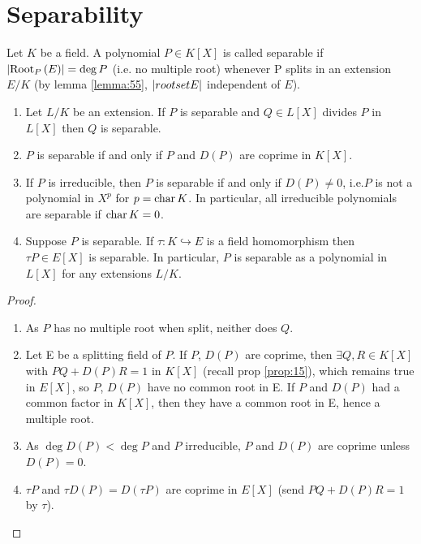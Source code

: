 \section{Separability}

\begin{definition}
\label{def:72}
  Let $K$ be a field. A polynomial $P \in K[X]$ is called separable if $\card{\rootset[P]{E}} = \deg P$ (i.e. no multiple root) whenever P splits in an extension $E/K$ (by lemma \ref{lemma:55}, $\card{rootset{E}}$ independent of $E$).
\end{definition}

\begin{lemma}
\label{lemma:73}
\begin{enumerate}
\item Let $L/K$ be an extension. If $P$ is separable and $Q \in L[X]$ divides $P$ in $L[X]$ then $Q$ is separable.
\item $P$ is separable if and only if $P$ and $D(P)$ are coprime in $K[X]$.
\item If $P$ is irreducible, then $P$ is separable if and only if $D(P) \neq 0$, i.e.$P$ is not a polynomial in $X^p$ for $p = \mchar K$. In particular, all irreducible polynomials are separable if $\mchar K = 0$.
\item Suppose $P$ is separable. If $\tau : K \hookrightarrow E$ is a field homomorphism then $\tau{}P \in E[X]$ is separable. In particular, $P$ is separable as a polynomial in $L[X]$ for any extensions $L/K$.
\end{enumerate}
\end{lemma}

\begin{proof}
  \begin{enumerate}
  \item As $P$ has no multiple root when split, neither does $Q$. 
  \item Let E be a splitting field of $P$. If $P$, $D(P)$ are coprime, then $\exists Q, R \in K[X]$ with $PQ + D(P)R = 1$ in $K[X]$ (recall prop \ref{prop:15}), which remains true in $E[X]$, so $P$, $D(P)$ have no common root in E. If $P$ and $D(P)$ had a common factor in $K[X]$, then they have a common root in E, hence a multiple root.
  \item As $\deg D(P) < \deg P$ and $P$ irreducible, $P$ and $D(P)$ are coprime unless $D(P) = 0$. 
  \item $\tau{}P$ and $\tau{}D(P) = D(\tau{}P)$ are coprime in $E[X]$ (send $PQ + D(P)R = 1$ by $\tau$).
  \end{enumerate}
\end{proof}

